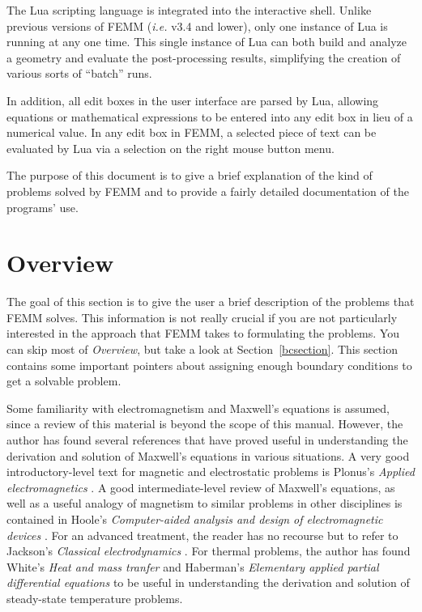 \documentclass[12pt]{report}
\begin{document}
The Lua scripting language is integrated into the interactive
shell. Unlike previous versions of FEMM ({\em i.e.} v3.4 and
lower), only one instance of Lua is running at any one time. This
single instance of Lua can both build and analyze a geometry and
evaluate the post-processing results, simplifying the creation of
various sorts of ``batch'' runs.

In addition, all edit boxes in the user interface are parsed by
Lua, allowing equations or mathematical expressions to be entered
into any edit box in lieu of a numerical value.  In any edit box in
FEMM, a selected piece of text can be evaluated by Lua via a
selection on the right mouse button menu.

The purpose of this document is to give a brief explanation of the
kind of problems solved by FEMM and to provide a fairly detailed
documentation of the programs' use.

\section{Overview}

The goal of this section is to give the user a brief description of
the problems that FEMM solves.  This information is not really
crucial if you are not particularly interested in the approach that
FEMM takes to formulating the problems.  You can skip most of {\em
Overview}, but take a look at Section~\ref{bcsection}.  This
section contains some important pointers about assigning enough
boundary conditions to get a solvable problem.

Some familiarity with electromagnetism and Maxwell's equations is
assumed, since a review of this material is beyond the scope of
this manual. However, the author has found several references that
have proved useful in understanding the derivation and solution of
Maxwell's equations in various situations.  A very good
introductory-level text for magnetic and electrostatic problems
is Plonus's {\em Applied electromagnetics}
\cite{Plonus}. A good intermediate-level review of Maxwell's
equations, as well as a useful analogy of magnetism to similar
problems in other disciplines is contained in Hoole's {\em
Computer-aided analysis and design of electromagnetic devices}
\cite{Hoole}.  For an advanced treatment, the reader has no
recourse but to refer to Jackson's {\em Classical electrodynamics}
\cite{Jackson}.  For thermal problems, the author has found
White's {\em Heat and mass tranfer} \cite{FrankWhite} and 
Haberman's {\em Elementary applied partial differential equations}
\cite{Haberman} to be useful in understanding the derivation and solution of
steady-state temperature problems.  
\end{document}
